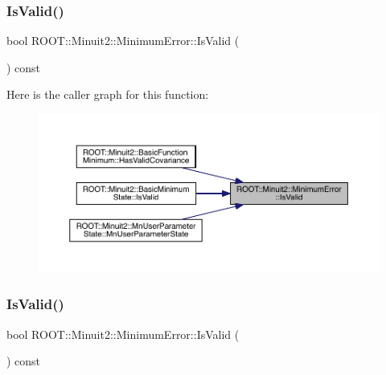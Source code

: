 \mbox{\label{classROOT_1_1Minuit2_1_1MinimumError_a0e9a9c525f7ac2e5dc5c7973056a852b}} 
\subsubsection{\texorpdfstring{IsValid()}{IsValid()}\hspace{0.1cm}{\footnotesize\ttfamily [2/3]}}
{\footnotesize\ttfamily bool R\+O\+O\+T\+::\+Minuit2\+::\+Minimum\+Error\+::\+Is\+Valid (\begin{DoxyParamCaption}{ }\end{DoxyParamCaption}) const\hspace{0.3cm}{\ttfamily [inline]}}

Here is the caller graph for this function\+:
\nopagebreak
\begin{figure}[H]
\begin{center}
\leavevmode
\includegraphics[width=350pt]{d5/d32/classROOT_1_1Minuit2_1_1MinimumError_a0e9a9c525f7ac2e5dc5c7973056a852b_icgraph}
\end{center}
\end{figure}
\mbox{\label{classROOT_1_1Minuit2_1_1MinimumError_a0e9a9c525f7ac2e5dc5c7973056a852b}} 
\subsubsection{\texorpdfstring{IsValid()}{IsValid()}\hspace{0.1cm}{\footnotesize\ttfamily [3/3]}}
{\footnotesize\ttfamily bool R\+O\+O\+T\+::\+Minuit2\+::\+Minimum\+Error\+::\+Is\+Valid (\begin{DoxyParamCaption}{ }\end{DoxyParamCaption}) const\hspace{0.3cm}{\ttfamily [inline]}}

